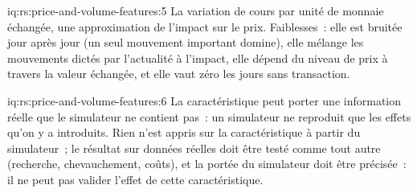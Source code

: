 \begin{solution}{iq:rs:price-and-volume-features:5}
La variation de cours par unité de monnaie échangée, une approximation de l'impact sur le prix. Faiblesses~: elle est bruitée jour après jour (un seul mouvement important domine), elle mélange
les mouvements dictés par l'actualité à l'impact, elle dépend du niveau de prix à travers la valeur échangée, et elle vaut zéro les jours sans transaction.
\end{solution}

\begin{solution}{iq:rs:price-and-volume-features:6}
La caractéristique peut porter une information réelle que le simulateur ne contient pas~: un simulateur ne reproduit que les effets qu'on y a introduits. Rien
n'est appris sur la caractéristique à partir du simulateur~; le résultat sur données réelles doit être testé comme tout autre (recherche, chevauchement, coûts), et la
portée du simulateur doit être précisée~: il ne peut pas valider l'effet de cette caractéristique.
\end{solution}

